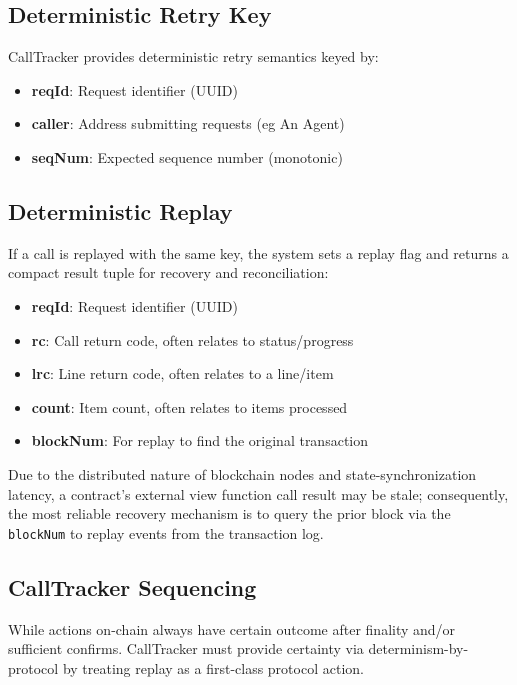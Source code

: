 \documentclass[10pt]{article}
\begin{document}
\subsection{Deterministic Retry Key}
CallTracker provides deterministic retry semantics keyed by:

\begin{itemize}
    \item \textbf{reqId}: Request identifier (UUID)
    \item \textbf{caller}: Address submitting requests (eg An Agent)
    \item \textbf{seqNum}: Expected sequence number (monotonic)
\end{itemize}

\subsection{Deterministic Replay}

If a call is replayed with the same key, the system sets a replay flag and returns a compact result tuple for recovery and reconciliation:

\begin{itemize}
    \item \textbf{reqId}: Request identifier (UUID)
    \item \textbf{rc}: Call return code, often relates to status/progress
    \item \textbf{lrc}: Line return code, often relates to a line/item
    \item \textbf{count}: Item count, often relates to items processed
    \item \textbf{blockNum}: For replay to find the original transaction
\end{itemize}

\begin{GsNoteHigh}
    Due to the distributed nature of blockchain nodes and state-synchronization latency, a contract's external view function call result may be stale; consequently, the most reliable recovery mechanism is to query the prior block via the \texttt{blockNum} to replay events from the transaction log.
\end{GsNoteHigh}

\clearpage
\subsection{CallTracker Sequencing}
While actions on-chain always have certain outcome after finality and/or sufficient confirms. CallTracker must provide certainty via determinism-by-protocol by treating replay as a first-class protocol action.
\end{document}
